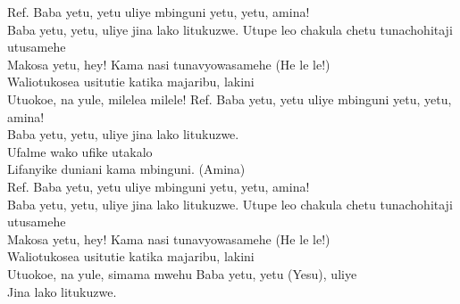 
Ref. Baba yetu, yetu uliye mbinguni yetu, yetu, amina! \\
 Baba yetu, yetu, uliye jina lako litukuzwe.
\hops
Utupe leo chakula chetu tunachohitaji utusamehe \\
Makosa yetu, hey!  Kama nasi tunavyowasamehe (He le le!)\\
Waliotukosea usitutie katika majaribu, lakini \tab{}\\
Utuokoe, na yule, milelea milele! \tab{}
\hops
Ref. Baba yetu, yetu uliye mbinguni yetu, yetu, amina! \\
 Baba yetu, yetu, uliye jina lako litukuzwe. 
\hops
\tab{}\tab{}\\
\tab{}\tab{}
\hops
Ufalme wako ufike utakalo \tab{}\\
Lifanyike duniani kama mbinguni. (Amina) 
\hops
\tab{}\tab{}\\
\tab{}\tab{}
\hops
Ref. Baba yetu, yetu uliye mbinguni yetu, yetu, amina! \\
 Baba yetu, yetu, uliye jina lako litukuzwe. 
\hops
Utupe leo chakula chetu tunachohitaji utusamehe\\
Makosa yetu, hey!  Kama nasi tunavyowasamehe (He le le!)\\
Waliotukosea usitutie katika majaribu, lakini\\
Utuokoe, na yule, simama mwehu
\hops
Baba yetu, yetu (Yesu), uliye \tab{} \\
Jina lako litukuzwe. \tab{}\\
\tab{}\tab{}

